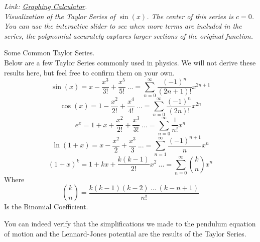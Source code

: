 \documentclass[11pt]{article}
\theoremstyle{gangnamstyle}{\newtheorem{definition}{Definition}[]}
\theoremstyle{gangnamstyle}{\newtheorem{example}{Example}[]}
\theoremstyle{gangnamstyle}{\newtheorem{problem}{Problem}[]}
\theoremstyle{gangnamstyle}{\newtheorem{warning}{Warning}[]}
\begin{document}
\textit{Link: \href{https://www.desmos.com/calculator/lldzowzesu}{Graphing Calculator}. \\
Visualization of the Taylor Series of $\sin(x)$. The center of this series is $c = 0$. You can use the interactive slider to see when more terms are included in the series, the polynomial accurately captures larger sections of the original function.}

\begin{definition}
Some Common Taylor Series. \\
Below are a few Taylor Series commonly used in physics. We will not derive these results here, but feel free to confirm them on your own. 
\begin{equation}
\sin(x) = x - \frac{x^3}{3!} + \frac{x^5}{5!} \ ... = \sum_{n = 0}^{\infty} \frac{(-1)^n}{(2n + 1)!}x^{2n + 1}
\end{equation}
\begin{equation}
\cos(x) = 1 - \frac{x^2}{2!} + \frac{x^4}{4!} \ ... = \sum_{n = 0}^{\infty} \frac{(-1)^n}{(2n)!}x^{2n}
\end{equation}
\begin{equation}
e^x = 1 + x + \frac{x^2}{2!} + \frac{x^3}{3!} \ ... = \sum_{n = 0}^{\infty} \frac{1}{n!}x^n
\end{equation}
\begin{equation}
\ln(1 + x) = x - \frac{x^2}{2} + \frac{x^3}{3} \ ... = \sum_{n = 1}^{\infty} \frac{(-1)^{n + 1}}{n}x^n
\end{equation}
\begin{equation}
(1 + x)^k = 1 + kx + \frac{k(k - 1)}{2!}x^2 \ ... = \sum_{n = 0}^{\infty} \binom{k}{n} x^n
\end{equation}
Where
\[ \binom{k}{n} = \frac{k(k - 1)(k - 2) \ ... \ (k - n + 1)}{n!} \]
Is the Binomial Coefficient. 
\end{definition}

You can indeed verify that the simplifications we made to the pendulum equation of motion and the Lennard-Jones potential are the results of the Taylor Series. 

\pagebreak
\end{document}
